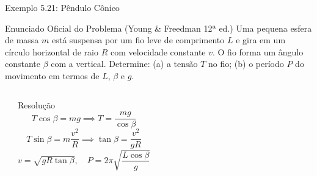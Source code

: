 \documentclass[10pt,aspectratio=169]{beamer}
\begin{document}
\begin{frame}{Exemplo 5.21: Pêndulo Cônico}
    \begin{block}{Enunciado Oficial do Problema (Young \& Freedman 12ª ed.)}
        \small
        Uma pequena esfera de massa $m$ está suspensa por um fio leve de comprimento $L$ e gira em um círculo horizontal de raio $R$ com velocidade constante $v$. O fio forma um ângulo constante $\beta$ com a vertical. Determine: (a) a tensão $T$ no fio; (b) o período $P$ do movimento em termos de $L$, $\beta$ e $g$.
    \end{block}
    \begin{columns}[T]
        \begin{center}
        \end{center}
        \begin{exampleblock}{Resolução}
            \small
            $$T \cos\beta = mg \implies T = \frac{mg}{\cos\beta}$$
            $$T \sin\beta = m \frac{v^2}{R} \implies \tan\beta = \frac{v^2}{gR}$$
            $$v = \sqrt{g R \tan\beta}, \quad P = 2\pi \sqrt{\frac{L \cos\beta}{g}}$$
        \end{exampleblock}
    \end{columns}
\end{frame}
\end{document}
